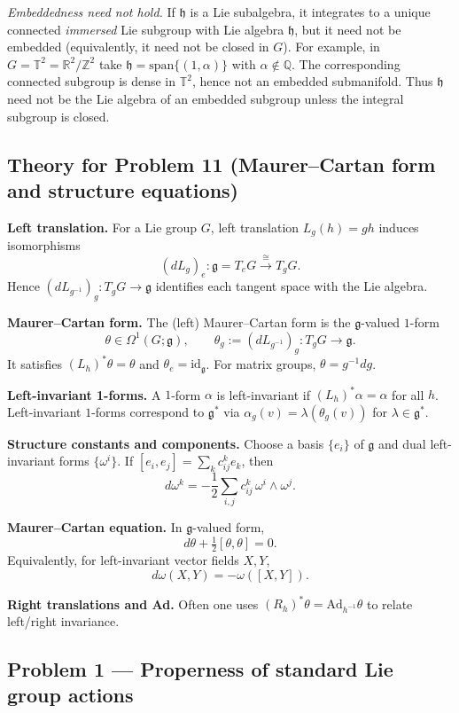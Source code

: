 \documentclass[12pt,a4paper]{article}
\theoremstyle{plain}
\theoremstyle{definition}      %
\begin{document}
\emph{Embeddedness need not hold.}
If $\mathfrak h$ is a Lie subalgebra, it integrates to a unique connected \emph{immersed} Lie subgroup with Lie algebra
$\mathfrak h$, but it need not be embedded (equivalently, it need not be closed in $G$).
For example, in $G=\mathbb T^2=\mathbb R^2/\mathbb Z^2$ take $\mathfrak h=\mathrm{span}\{(1,\alpha)\}$ with
$\alpha\notin\mathbb Q$. The corresponding connected subgroup is dense in $\mathbb T^2$, hence not an embedded submanifold.
Thus $\mathfrak h$ need not be the Lie algebra of an embedded subgroup unless the integral subgroup is closed.

\subsection*{Theory for Problem 11 (Maurer--Cartan form and structure equations)}

\textbf{Left translation.}
For a Lie group $G$, left translation $L_g(h)=gh$ induces isomorphisms
\[
(dL_g)_e:\mathfrak g=T_eG \xrightarrow{\cong} T_gG.
\]
Hence $(dL_{g^{-1}})_g:T_gG\to\mathfrak g$ identifies each tangent space with the Lie algebra.

\textbf{Maurer--Cartan form.}
The (left) Maurer--Cartan form is the $\mathfrak g$-valued $1$-form
\[
\theta\in\Omega^1(G;\mathfrak g),\qquad \theta_g:=(dL_{g^{-1}})_g:T_gG\to\mathfrak g.
\]
It satisfies $(L_h)^*\theta=\theta$ and $\theta_e=\mathrm{id}_{\mathfrak g}$.
For matrix groups, $\theta=g^{-1}dg$.

\textbf{Left-invariant 1-forms.}
A $1$-form $\alpha$ is left-invariant if $(L_h)^*\alpha=\alpha$ for all $h$.
Left-invariant $1$-forms correspond to $\mathfrak g^*$ via
$\alpha_g(v)=\lambda(\theta_g(v))$ for $\lambda\in\mathfrak g^*$.

\textbf{Structure constants and components.}
Choose a basis $\{e_i\}$ of $\mathfrak g$ and dual left-invariant forms $\{\omega^i\}$.
If $[e_i,e_j]=\sum_k c_{ij}^k e_k$, then
\[
d\omega^k=-\frac12\sum_{i,j} c_{ij}^k\,\omega^i\wedge\omega^j.
\]

\textbf{Maurer--Cartan equation.}
In $\mathfrak g$-valued form,
\[
d\theta+\tfrac12[\theta,\theta]=0.
\]
Equivalently, for left-invariant vector fields $X,Y$,
\[
d\omega(X,Y)=-\omega([X,Y]).
\]

\textbf{Right translations and Ad.}
Often one uses $(R_h)^*\theta=\mathrm{Ad}_{h^{-1}}\theta$ to relate left/right invariance.


\subsection*{Problem 1 — Properness of standard Lie group actions}
\end{document}
